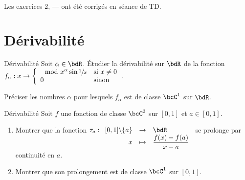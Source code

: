 \documentclass[a4paper,french,bookmarks]{article}
\begin{document}
\inittd

\begin{center}
    \begin{minipage}{.7\linewidth}
        \begin{tcolorbox}[
            breakable,
            breakable,
            enhanced,
            interior style      = {left color=main4!15,right color=main2!12},
            borderline north    = {.5pt}{0pt}{main2!10},
            borderline south    = {.5pt}{0pt}{main2!10},
            borderline west     = {.5pt}{0pt}{main2!10},
            borderline east     = {.5pt}{0pt}{main2!10},
            sharp corners       = downhill,
            arc                 = 0 cm,
            boxrule             = 0.5pt,
            drop fuzzy shadow   = black!40!white,
            nobeforeafter,
        ]
        \centering Les exercices 2, --- ont été corrigés en séance de TD.
    \end{tcolorbox}
\end{minipage}
\end{center}

\section{Dérivabilité}

\begin{exotd}{Dérivabilité}{}
    Soit $\alpha \in \bdR$. Étudier la dérivabilité sur $\bdR$ de la fonction $f_\alpha : x \to \left\lbrace \begin{array}{ll}
        \mod{x}^\alpha\sin{\sfrac{1}{x}} &\text{si} \ x \neq 0  \\
        0 &\text{sinon}
    \end{array}\right.$.
    
    Préciser les nombres $\alpha$ pour lesquels $f_\alpha$ est de classe $\bcC^1$ sur $\bdR$.
\end{exotd}

\boxans{

}

\begin{exotd}{Dérivabilité}{}
    Soit $f$ une fonction de classe $\bcC^2$ sur $[0, 1]$ et $a \in [0, 1]$.
    
    \begin{enumerate}
        \item Montrer que la fonction $\tau_a : \begin{array}[t]{rcl}
            [0, 1] \backslash \{a\} &\to& \bdR  \\
            x &\mapsto& \dfrac{f(x) - f(a)}{x - a}
        \end{array}$ se prolonge par continuité en $a$.
        
        \item Montrer que son prolongement est de classe $\bcC^1$ sur $[0, 1]$.
    \end{enumerate}
\end{exotd}
\end{document}
